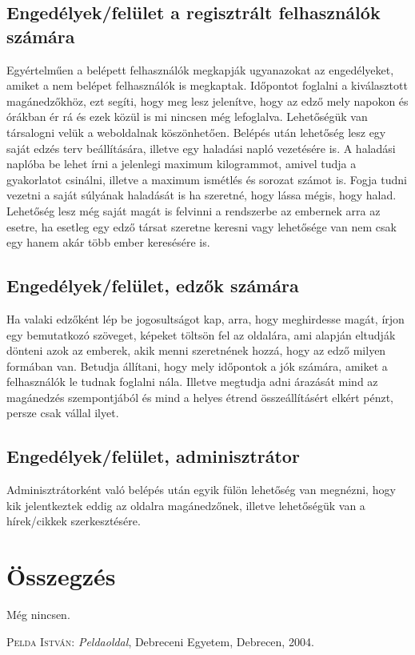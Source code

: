 \documentclass[
]{thesis-ekf}
\theoremstyle{definition}
\theoremstyle{remark}
\begin{document}
	\section{Engedélyek/felület a regisztrált felhasználók számára}
	Egyértelműen a belépett felhasználók megkapják ugyanazokat az engedélyeket, amiket a nem belépet felhasználók is megkaptak. Időpontot foglalni a kiválasztott magánedzőkhöz, ezt segíti, hogy meg lesz jelenítve, hogy az edző mely napokon és órákban ér rá és ezek közül is mi nincsen még lefoglalva. Lehetőségük van társalogni velük a weboldalnak köszönhetően. Belépés után lehetőség lesz egy saját edzés terv beállítására, illetve egy haladási napló vezetésére is. A haladási naplóba be lehet írni a jelenlegi maximum kilogrammot, amivel tudja a gyakorlatot csinálni, illetve a maximum ismétlés és sorozat számot is. Fogja tudni vezetni a saját súlyának haladását is ha szeretné, hogy lássa mégis, hogy halad. Lehetőség lesz még saját magát is felvinni a rendszerbe az embernek arra az esetre, ha esetleg egy edző társat szeretne keresni vagy lehetősége van nem csak egy hanem akár több ember keresésére is.
	
	\section{Engedélyek/felület, edzők számára}
	Ha valaki edzőként lép be jogosultságot kap, arra, hogy meghirdesse magát, írjon egy bemutatkozó szöveget, képeket töltsön fel az oldalára, ami alapján eltudják dönteni azok az emberek, akik menni szeretnének hozzá, hogy az edző milyen formában van. Betudja állítani, hogy mely időpontok a jók számára, amiket a felhasználók le tudnak foglalni nála. Illetve megtudja adni árazását mind az magánedzés szempontjából és mind a helyes étrend összeállításért elkért pénzt, persze csak vállal ilyet.
	
	\section{Engedélyek/felület, adminisztrátor}
	Adminisztrátorként való belépés után egyik fülön lehetőség van megnézni, hogy kik jelentkeztek eddig az oldalra magánedzőnek, illetve lehetőségük van a hírek/cikkek szerkesztésére.
	
	
	\chapter*{Összegzés}
	Még nincsen.
	
	\begin{thebibliography}{2}
		\textsc{Pelda István}: \emph{Peldaoldal}, Debreceni Egyetem, Debrecen, 2004.
	\end{thebibliography}
	
\end{document}
